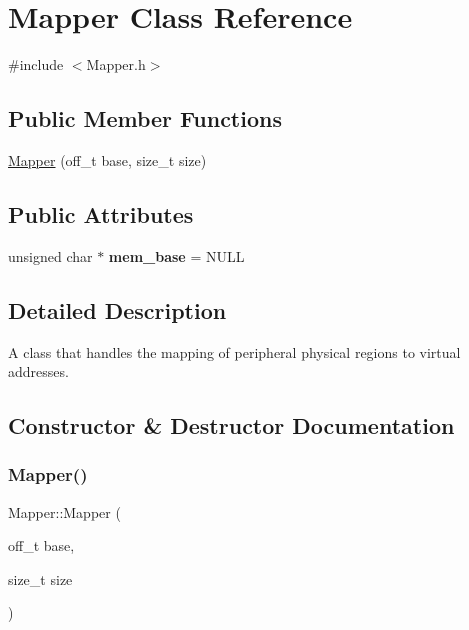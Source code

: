 \hypertarget{classMapper}{}\section{Mapper Class Reference}
\label{classMapper}


{\ttfamily \#include $<$Mapper.\+h$>$}

\subsection*{Public Member Functions}
\begin{DoxyCompactItemize}
\item 
\mbox{\hyperlink{classMapper_ad94bc5276f51985b51f72922f64bc19e}{Mapper}} (off\+\_\+t base, size\+\_\+t size)
\end{DoxyCompactItemize}
\subsection*{Public Attributes}
\begin{DoxyCompactItemize}
\item 
\mbox{\label{classMapper_afadadee19eb92436827f4f1e8c71a4e6}} 
unsigned char $\ast$ {\bfseries mem\+\_\+base} = N\+U\+LL
\end{DoxyCompactItemize}


\subsection{Detailed Description}
A class that handles the mapping of peripheral physical regions to virtual addresses. 

\subsection{Constructor \& Destructor Documentation}
\mbox{\label{classMapper_ad94bc5276f51985b51f72922f64bc19e}} 
\subsubsection{\texorpdfstring{Mapper()}{Mapper()}}
{\footnotesize\ttfamily Mapper\+::\+Mapper (\begin{DoxyParamCaption}\item[{off\+\_\+t}]{base,  }\item[{size\+\_\+t}]{size }\end{DoxyParamCaption})}

